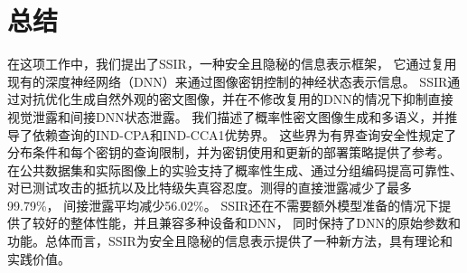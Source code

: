 \documentclass[UTF8,a4paper,zihao=-4,fontset=windows,openany]{ctexbook}
\begin{document}
\chapter{总结}
在这项工作中，我们提出了SSIR，一种安全且隐秘的信息表示框架，
它通过复用现有的深度神经网络（DNN）来通过图像密钥控制的神经状态表示信息。
SSIR通过对抗优化生成自然外观的密文图像，并在不修改复用的DNN的情况下抑制直接视觉泄露和间接DNN状态泄露。
我们描述了概率性密文图像生成和多语义，并推导了依赖查询的IND-CPA和IND-CCA1优势界。
这些界为有界查询安全性规定了分布条件和每个密钥的查询限制，并为密钥使用和更新的部署策略提供了参考。
在公共数据集和实际图像上的实验支持了概率性生成、通过分组编码提高可靠性、
对已测试攻击的抵抗以及比特级失真容忍度。测得的直接泄露减少了最多99.79\%，
间接泄露平均减少56.02\%。
SSIR还在不需要额外模型准备的情况下提供了较好的整体性能，并且兼容多种设备和DNN，
同时保持了DNN的原始参数和功能。总体而言，SSIR为安全且隐秘的信息表示提供了一种新方法，具有理论和实践价值。
\end{document}
